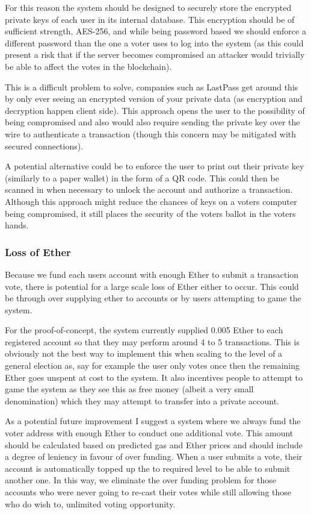 \documentclass{article}
\begin{document}
	For this reason the system should be designed to securely store the encrypted private keys of each user in its internal database. This encryption should be of sufficient strength, AES-256, and while being password based we should enforce a different password than the one a voter uses to log into the system (as this could present a risk that if the server becomes compromised an attacker would trivially be able to affect the votes in the blockchain).

	This is a difficult problem to solve, companies such as LastPass get around this by only ever seeing an encrypted version of your private data (as encryption and decryption happen client side). This approach opens the user to the possibility of being compromised and also would also require sending the private key over the wire to authenticate a transaction (though this concern may be mitigated with secured connections).
		
	A potential alternative could be to enforce the user to print out their private key (similarly to a paper wallet) in the form of a QR code. This could then be scanned in when necessary to unlock the account and authorize a transaction. Although this approach might reduce the chances of keys on a voters computer being compromised, it still places the security of the voters ballot in the voters hands.

	\subsubsection{Loss of Ether}
	\label{sub:LossOfEther}
	Because we fund each users account with enough Ether to submit a transaction vote, there is potential for a large scale loss of Ether either to occur. This could be through over supplying ether to accounts or by users attempting to game the system. 
	
	For the proof-of-concept, the system currently supplied 0.005 Ether to each registered account so that they may perform around 4 to 5 transactions. This is obviously not the best way to implement this when scaling to the level of a general election as, say for example the user only votes once then the remaining Ether goes unspent at cost to the system. It also incentives people to attempt to game the system as they see this as free money (albeit a very small denomination) which they may attempt to transfer into a private account.
	
	As a potential future improvement I suggest a system where we always fund the voter address with enough Ether to conduct one additional vote. This amount should be calculated based on predicted gas and Ether prices and should include a degree of leniency in favour of over funding. When a user submits a vote, their account is automatically topped up the to required level to be able to submit another one. In this way, we eliminate the over funding problem for those accounts who were never going to re-cast their votes while still allowing those who do wish to, unlimited voting opportunity.
	
\end{document}
